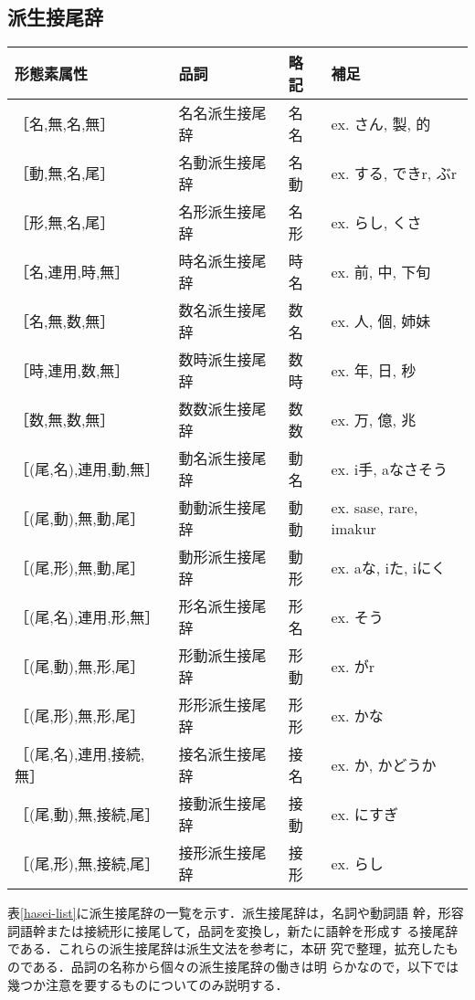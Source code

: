 \subsection{派生接尾辞}
\begin{table*}
\begin{center}
\begin{tabular}{|l|l|l|l|}
\hline
形態素属性 & 品詞 & 略記 & 補足 \\
\hline
［名,無,名,無］         & 名名派生接尾辞 & 名名 & ex. さん, 製, 的 \\
［動,無,名,尾］         & 名動派生接尾辞 & 名動 & ex. する, できr, ぶr \\
［形,無,名,尾］         & 名形派生接尾辞 & 名形 & ex. らし, くさ \\
\hline
［名,連用,時,無］       & 時名派生接尾辞 & 時名 & ex. 前, 中, 下旬 \\
［名,無,数,無］         & 数名派生接尾辞 & 数名 & ex. 人, 個, 姉妹 \\
［時,連用,数,無］       & 数時派生接尾辞 & 数時 & ex. 年, 日, 秒 \\
［数,無,数,無］         & 数数派生接尾辞 & 数数 & ex. 万, 億, 兆 \\
\hline
［(尾,名),連用,動,無］  & 動名派生接尾辞 & 動名 & ex. i手, aなさそう \\
［(尾,動),無,動,尾］    & 動動派生接尾辞 & 動動 & ex. sase, rare, imakur \\
［(尾,形),無,動,尾］    & 動形派生接尾辞 & 動形 & ex. aな, iた, iにく\\
\hline
［(尾,名),連用,形,無］  & 形名派生接尾辞 & 形名 & ex. そう \\
［(尾,動),無,形,尾］    & 形動派生接尾辞 & 形動 & ex. がr \\
［(尾,形),無,形,尾］    & 形形派生接尾辞 & 形形 & ex. かな \\
\hline
［(尾,名),連用,接続,無］& 接名派生接尾辞 & 接名 & ex. か, かどうか  \\
［(尾,動),無,接続,尾］  & 接動派生接尾辞 & 接動 & ex. にすぎ \\
［(尾,形),無,接続,尾］  & 接形派生接尾辞 & 接形 & ex. らし \\
\hline
\end{tabular}
\end{center}
\caption{派生接尾辞}
\label{hasei-list}
\end{table*}

表\ref{hasei-list}に派生接尾辞の一覧を示す．派生接尾辞は，名詞や動詞語
幹，形容詞語幹または接続形に接尾して，品詞を変換し，新たに語幹を形成す
る接尾辞である．これらの派生接尾辞は派生文法\cite{kiyose}を参考に，本研
究で整理，拡充したものである．品詞の名称から個々の派生接尾辞の働きは明
らかなので，以下では幾つか注意を要するものについてのみ説明する．


